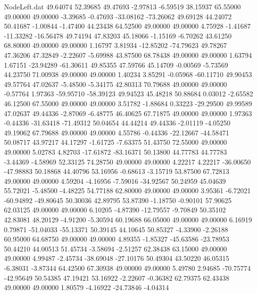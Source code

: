 \begin{filecontents}{NodeLeft.dat}
  49.64074   52.39685   49.47693    -2.97813   -6.59519   38.15937   65.55000   49.00000   49.00000   -3.39685   -0.47693  -33.08162  -73.26062
  49.69128   44.24072   50.41687    -1.00844   -1.47400   44.23438   64.52500   49.00000   49.00000    4.75928   -1.41687  -11.33282  -16.56478
  49.74194   47.83203   45.18066    -1.15169   -6.70262   43.61250   68.80000   49.00000   49.00000    1.16797    3.81934  -12.85202  -74.79623
  49.78267   47.36206   47.32849    -2.22607   -5.69988   43.87500   68.78438   49.00000   49.00000    1.63794    1.67151  -23.94289  -61.30611
  49.85355   47.59766   45.14709    -0.00569   -5.73569   44.23750   71.00938   49.00000   49.00000    1.40234    3.85291   -0.05968  -60.11710
  49.90453   49.57764   47.02637    -5.48500   -5.34175   42.80313   70.79688   49.00000   49.00000   -0.57764    1.97363  -59.95710  -58.39123
  49.94523   45.48218   50.88684     0.03012   -2.65582   46.12500   67.55000   49.00000   49.00000    3.51782   -1.88684    0.33223  -29.29500
  49.99589   47.02637   49.44336    -2.87069   -6.48775   46.40625   67.71875   49.00000   49.00000    1.97363   -0.44336  -31.63418  -71.49312
  50.04654   44.44214   49.44336    -2.01119   -4.05250   49.19062   67.79688   49.00000   49.00000    4.55786   -0.44336  -22.12667  -44.58471
  50.08717   43.97217   44.17297    -1.61725   -7.63375   51.43750   72.55000   49.00000   49.00000    5.02783    4.82703  -17.61872  -83.16371
  50.13800   44.77783   44.77783    -3.44369   -4.58969   52.33125   74.28750   49.00000   49.00000    4.22217    4.22217  -36.00650  -47.98883
  50.18868   44.40796   53.16956    -0.68613   -3.15719   53.87500   67.72813   49.00000   49.00000    4.59204   -4.16956   -7.59016  -34.92567
  50.24959   45.04639   55.72021    -5.48500   -4.48225   54.77188   62.80000   49.00000   49.00000    3.95361   -6.72021  -60.94892  -49.80645
  50.30036   42.89795   53.87390    -1.18750   -0.90101   57.90625   62.03125   49.00000   49.00000    6.10205   -4.87390  -12.79557   -9.70849
  50.35102   42.83081   48.20129    -4.91200   -5.30594   60.19688   66.05000   49.00000   49.00000    6.16919    0.79871  -51.04033  -55.13371
  50.39145   44.10645   50.85327    -4.33900   -2.26188   60.95000   64.68750   49.00000   49.00000    4.89355   -1.85327  -45.63586  -23.78953
  50.44210   44.00513   51.45734    -3.58694   -2.51257   62.38438   63.15000   49.00000   49.00000    4.99487   -2.45734  -38.69048  -27.10176
  50.49304   43.50220   46.05315    -6.38031   -3.87344   64.42500   67.30938   49.00000   49.00000    5.49780    2.94685  -70.75774  -42.95649
  50.54385   47.19421   53.16922    -2.22607   -0.36382   62.79375   62.43438   49.00000   49.00000    1.80579   -4.16922  -24.73846   -4.04314

\end{filecontents}
